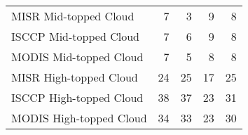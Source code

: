 \begin{tabular}{lrrrr}
   MISR Mid-topped Cloud &                        7 &                        3 &                        9 &                        8 \\
  ISCCP Mid-topped Cloud &                        7 &                        6 &                        9 &                        8 \\
  MODIS Mid-topped Cloud &                        7 &                        5 &                        8 &                        8 \\
  MISR High-topped Cloud &                       24 &                       25 &                       17 &                       25 \\
 ISCCP High-topped Cloud &                       38 &                       37 &                       23 &                       31 \\
 MODIS High-topped Cloud &                       34 &                       33 &                       23 &                       30 \\ \hline
\end{tabular}
